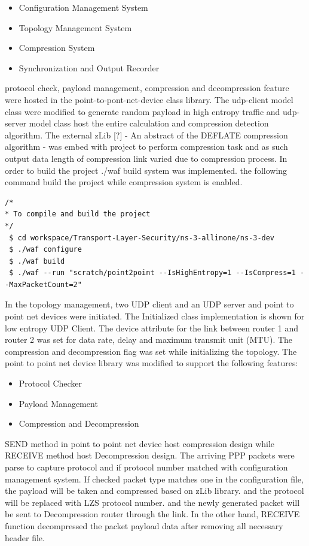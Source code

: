 \documentclass[sigconf]{acmart}
\begin{document}
\begin{itemize}
\item Configuration Management System
\item Topology Management System
\item Compression System
\item Synchronization and Output Recorder
\end{itemize}

protocol check, payload management, compression and decompression feature were hosted in the point-to-pont-net-device class library. The udp-client model class were modified to generate random payload in high entropy traffic and udp-server model class host the entire calculation and compression detection algorithm. The external zLib [?] - An abstract of the DEFLATE compression algorithm - was embed with project to perform compression task and as such output data length of compression link varied due to compression process.  
In order to build the project ./waf build system was implemented. the following command build the project while compression system is enabled. 
 
 \begin{lstlisting}
/*
* To compile and build the project
*/
 $ cd workspace/Transport-Layer-Security/ns-3-allinone/ns-3-dev    
 $ ./waf configure
 $ ./waf build
 $ ./waf --run "scratch/point2point --IsHighEntropy=1 --IsCompress=1 --MaxPacketCount=2"

\end{lstlisting}

 
In the topology management, two UDP client and an UDP server and point to point net devices were initiated. The Initialized class implementation is shown for low entropy UDP Client. The device attribute for the link between router 1 and router 2 was set for data rate, delay and maximum transmit unit (MTU). The compression and decompression flag was set while initializing the topology. The point to point net device library was modified to support the following features: 
 
 
\begin{itemize}
\item Protocol Checker
\item Payload Management
\item Compression and Decompression
\end{itemize}
 
 SEND method in point to point net device host compression design while RECEIVE method host Decompression design. The arriving PPP packets were parse to capture protocol and if protocol number matched with configuration management system. If checked packet type matches one in the configuration file, the payload will be taken and compressed based on zLib library. and the protocol will be replaced with LZS protocol number. and the newly generated packet will be sent to Decompression router through the link.  
In the other hand, RECEIVE function decompressed the packet payload data after removing all necessary header file.   
 
\end{document}
